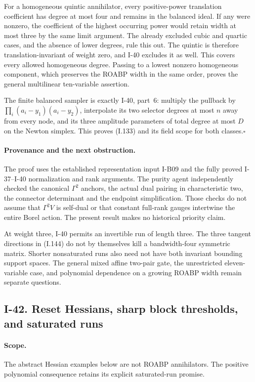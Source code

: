 For a homogeneous quintic annihilator, every positive-power
translation coefficient has degree at most four and remains
in the balanced ideal. If any were nonzero, the coefficient
of the highest occurring power would retain width at most
three by the same limit argument. The already excluded cubic
and quartic cases, and the absence of lower degrees, rule this
out. The quintic is therefore translation-invariant of weight
zero, and I-40 excludes it as well. This covers every allowed
homogeneous degree. Passing to a lowest nonzero homogeneous
component, which preserves the ROABP width in the same order,
proves the general multilinear ten-variable assertion.

The finite balanced sampler is exactly I-40, part~6: multiply
the pullback by $\prod_i(a_i-y_1)(a_i-y_2)$, interpolate its two
selector degrees at most $n$ away from every node, and its
three amplitude parameters of total degree at most $D$ on
the Newton simplex. This proves (I.133) and its field scope
for both classes.\hfill$\square$

\paragraph{Provenance and the next obstruction.}
The proof uses the established representation input I-B09 and
the fully proved I-37--I-40 normalization and rank arguments.
The purity agent independently checked the canonical
$\Gamma^2$ anchors, the actual dual pairing in characteristic
two, the connector determinant and the endpoint simplification.
Those checks do not assume that $\Gamma^2V$ is self-dual or
that constant full-rank gauges intertwine the entire Borel
action. The present result makes no historical priority claim.

At weight three, I-40 permits an invertible run of length three.
The three tangent directions in (I.144) do not by themselves
kill a bandwidth-four symmetric matrix. Shorter nonsaturated
runs also need not have both invariant bounding support spaces.
The general mixed affine two-pair gate, the unrestricted
eleven-variable case, and polynomial dependence on a growing
ROABP width remain separate questions.


\subsection{I-42. Reset Hessians, sharp block thresholds, and saturated runs}
\label{I-42}

\paragraph{Scope.}
The abstract Hessian examples below are not ROABP annihilators.
The positive polynomial consequence retains its explicit
saturated-run promise.


